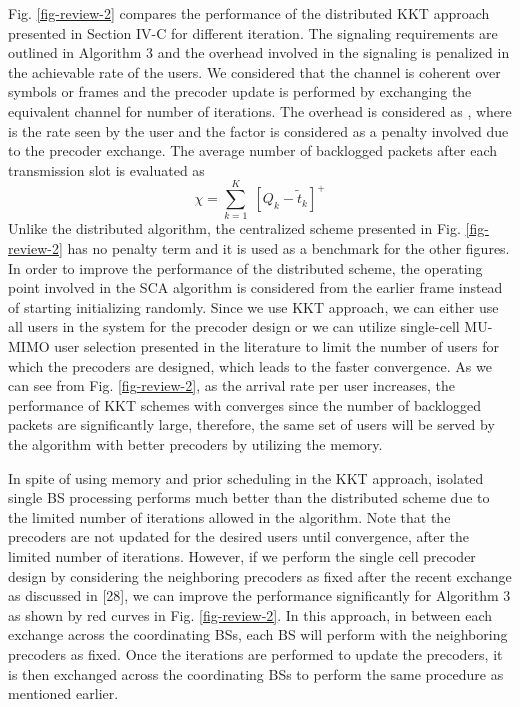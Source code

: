 \begin{enumerate}
	Fig. \ref{fig-review-2} compares the performance of the distributed \ac{KKT} approach presented in Section IV-C for different iteration. The signaling requirements are outlined in Algorithm 3 and the overhead involved in the signaling is penalized in the achievable rate of the users. We considered that the channel is coherent over  symbols or frames and the precoder update is performed by exchanging the equivalent channel for  number of iterations. The overhead is considered as , where  is the rate seen by the user and the factor  is considered as a penalty involved due to the precoder exchange. The average number of backlogged packets after each transmission slot is evaluated as 
	\begin{equation}
	\chi = \sum_{k = 1}^K \; [ Q_k - \tilde{t}_k ]^+
	\end{equation}
	Unlike the distributed algorithm, the centralized scheme presented in Fig. \ref{fig-review-2} has no penalty term and it is used as a benchmark for the other figures. In order to improve the performance of the distributed scheme, the operating point involved in the \ac{SCA} algorithm is considered from the earlier frame instead of starting initializing randomly. Since we use \ac{KKT} approach, we can either use all users in the system for the precoder design or we can utilize single-cell MU-MIMO user selection presented in the literature to limit the number of users for which the precoders are designed, which leads to the faster convergence. As we can see from Fig. \ref{fig-review-2}, as the arrival rate per user increases, the performance of \ac{KKT} schemes with  converges since the number of backlogged packets are significantly large, therefore, the same set of users will be served by the algorithm with better precoders by utilizing the memory. 
	
	In spite of using memory and prior scheduling in the \ac{KKT} approach, isolated single \ac{BS} processing performs much better than the distributed scheme due to the limited number of iterations allowed in the algorithm. Note that the precoders are not updated for the desired users until convergence, after the limited number of iterations. However, if we perform the single cell precoder design by considering the neighboring precoders as fixed after the recent exchange as discussed in [28], we can improve the performance significantly for Algorithm 3 as shown by red curves in Fig. \ref{fig-review-2}. In this approach, in between each exchange across the coordinating \acp{BS}, each \ac{BS} will perform  with the neighboring precoders as fixed. Once the iterations are performed to update the precoders, it is then exchanged across the coordinating \acp{BS} to perform the same procedure as mentioned earlier. 


\end{enumerate}
